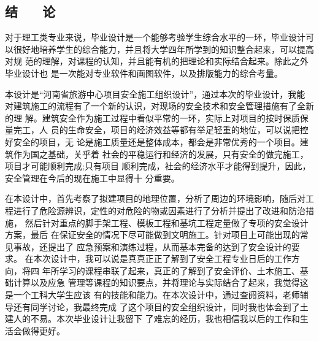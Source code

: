 \begin{center}
    \section*{  \textbf{结 ~~ 论}}
    \end{center}

对于理工类专业来说，毕业设计是一个能够考验学生综合水平的一环，毕业设计可
以很好地培养学生的综合能力，并且将大学四年所学到的知识整合起来，可以提高对规
范的理解，对课程的认知，并且能有机的把理论和实际结合起来。除此之外毕业设计也
是一次能对专业软件和画图软件，以及排版能力的综合考量。

本设计是“河南省旅游中心项目安全施工组织设计”，通过本次的毕业设计，我能
对建筑施工的流程有了一个新的认识，对现场的安全技术和安全管理措施有了全新的理
解。建筑安全作为施工过程中看似平常的一环，实际上对项目的按时保质保量完工，人
员的生命安全，项目的经济效益等都有举足轻重的地位，可以说把控好安全的项目，无
论是施工质量还是整体成本，都会是非常优秀的一个项目。建筑作为国之基础，关乎着
社会的平稳运行和经济的发展，只有安全的做完施工，项目才可能顺利完成;只有项目
顺利完成，社会的经济水平才能得到提升，因此，安全管理在今后的现在施工中显得十
分重要。

在本设计中，首先考察了拟建项目的地理位置，分析了周边的环境影响，随后对工
程进行了危险源辨识，定性的对危险的物或因素进行了分析并提出了改进和防治措施，
然后针对重点的脚手架工程、模板工程和基坑工程定量做了专项的安全设计方案，最后
在保证安全的情况下尽可能做到文明施工。针对项目上可能出现的常见事故，还提出了
应急预案和演练过程，从而基本完备的达到了安全设计的要求。
在本次设计中，我可以说是真真正正了解到了安全工程专业日后的工作方向，将四
年所学习的课程串联了起来，真正的了解到了安全评价、土木施工、基础计算以及应急
管理等课程的知识要点，并将理论与实际结合了起来，我觉得这是一个工科大学生应该
有的技能和能力。在本次设计中，通过查阅资料，老师辅导还有同学讨论，我最终完成
了这个项目的安全组织设计，同时我也体会到了土建人的不易。本次毕业设计让我留下
了难忘的经历，我也相信我以后的工作和生活会做得更好。
